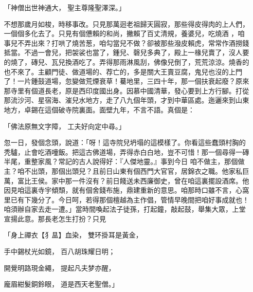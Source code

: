 \begin{showcontents}{}
「神僧出世神通大，  聖主尊隆聖澤深。」

不想那歲月如梭，時移事改。只見那萬迴老祖歸天圓寂，那些得皮得肉的上人們，一個個多化去了。只見有個憊賴的和尚，撇賴了百丈清規，養婆兒，吃燒酒 ，咱事兒不弄出來？打哄了燒苦葱，咱勾當兒不做？卻被那些潑皮賴虎，常常作酒撈錢抵當。不過一會兒，把袈裟也當了，鍾兒、磬兒多典了，殿上一椽兒賣了，沒人要的燒了，磚兒、瓦兒換酒吃了。弄得那雨淋風刮，佛像兒倒了，荒荒涼涼。燒香的也不來了。主顧門徒、做道場的、荐亡的，多是關大王賣豆腐，鬼兒也沒的上門了！一片鍾鼓道場，忽變做荒煙衰草！驀地里，三四十年，那一個扶衰起廢？原來那寺里有個道長老，原是西印度國出身。因慕中國清華，發心要到上方行腳。打從那流沙河、星宿海、漼兒水地方，走了八九個年頭，才到中華區處。迤邐來到山東地方，卓錫在這個破寺院裏面。面壁九年，不言不語。真個是：

「佛法原無文字障，  工夫好向定中尋。」

忽一日，發個念頭，說道：「呀！這寺院兒坍塌的這模樣了。你看這些蠢頭村胸的秃驢，止會吃酒噇飯。把這古佛道場，弄得赤白白地，豈不可惜！那一個尋得一磚半尾，重整家風？常記的古人說得好：『人傑地靈。』事到今日 咱不做主，那個做主？咱不出頭，那個出頭兒？且前日山東有個西門大官官，居錦衣之職。他家私巨萬，富比王侯。家中那一件沒有？前日餞送未西廉御史，曾在咱這裏擺設酒席。他因見咱這裏寺宇傾頹，就有個舍錢布施，鼎建重新的意思。咱那時口雖不言，心窩里已有下幾分了。今日呵，若得那個檀越為主作倡，管情早晚間把咱好事成就也！咱須辦自家去走一遭。」當時間喚起法子徒孫，打起鐘，敲起鼓，舉集大眾，上堂宣揚此意。那長老怎生打扮？只見

「身上禪衣【犭昷】血染，  雙环掛耳是黃金，

手中錫杖光如鏡，  百八胡珠耀日明；

開覺明路現金繩，  提起凡夫梦亦醒，

龐眉紺髮銅鈴眼，  道是西天老聖僧。」


\end{showcontents}
